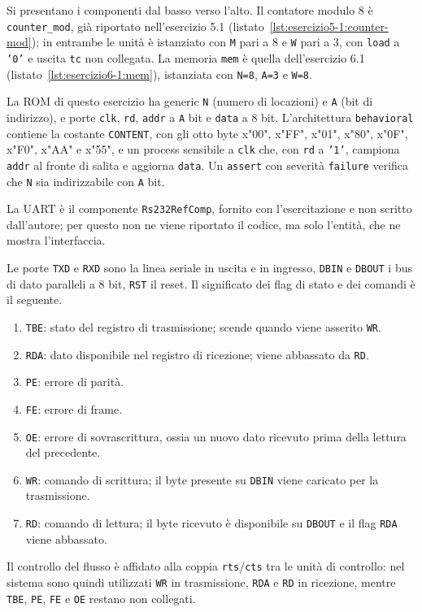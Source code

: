 Si presentano i componenti dal basso verso l'alto. Il contatore modulo 8 è \texttt{counter\_mod}, già riportato nell'esercizio 5.1 (listato~\ref{lst:esercizio5-1:counter-mod}); in entrambe le unità è istanziato con \texttt{M} pari a 8 e \texttt{W} pari a 3, con \texttt{load} a \texttt{'0'} e uscita \texttt{tc} non collegata. La memoria \texttt{mem} è quella dell'esercizio 6.1 (listato~\ref{lst:esercizio6-1:mem}), istanziata con \texttt{N=8}, \texttt{A=3} e \texttt{W=8}.

La ROM di questo esercizio ha generic \texttt{N} (numero di locazioni) e \texttt{A} (bit di indirizzo), e porte \texttt{clk}, \texttt{rd}, \texttt{addr} a \texttt{A} bit e \texttt{data} a 8 bit. L'architettura \texttt{behavioral} contiene la costante \texttt{CONTENT}, con gli otto byte x"00", x"FF", x"01", x"80", x"0F", x"F0", x"AA" e x"55", e un process sensibile a \texttt{clk} che, con \texttt{rd} a \texttt{'1'}, campiona \texttt{addr} al fronte di salita e aggiorna \texttt{data}. Un \texttt{assert} con severità \texttt{failure} verifica che \texttt{N} sia indirizzabile con \texttt{A} bit.


La UART è il componente \texttt{Rs232RefComp}, fornito con l'esercitazione e non scritto dall'autore; per questo non ne viene riportato il codice, ma solo l'entità, che ne mostra l'interfaccia.


Le porte \texttt{TXD} e \texttt{RXD} sono la linea seriale in uscita e in ingresso, \texttt{DBIN} e \texttt{DBOUT} i bus di dato paralleli a 8 bit, \texttt{RST} il reset. Il significato dei flag di stato e dei comandi è il seguente.
\begin{enumerate}
  \item \texttt{TBE}: stato del registro di trasmissione; scende quando viene asserito \texttt{WR}.
  \item \texttt{RDA}: dato disponibile nel registro di ricezione; viene abbassato da \texttt{RD}.
  \item \texttt{PE}: errore di parità.
  \item \texttt{FE}: errore di frame.
  \item \texttt{OE}: errore di sovrascrittura, ossia un nuovo dato ricevuto prima della lettura del precedente.
  \item \texttt{WR}: comando di scrittura; il byte presente su \texttt{DBIN} viene caricato per la trasmissione.
  \item \texttt{RD}: comando di lettura; il byte ricevuto è disponibile su \texttt{DBOUT} e il flag \texttt{RDA} viene abbassato.
\end{enumerate}
Il controllo del flusso è affidato alla coppia \texttt{rts}/\texttt{cts} tra le unità di controllo: nel sistema sono quindi utilizzati \texttt{WR} in trasmissione, \texttt{RDA} e \texttt{RD} in ricezione, mentre \texttt{TBE}, \texttt{PE}, \texttt{FE} e \texttt{OE} restano non collegati.

